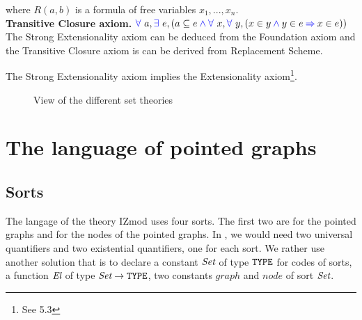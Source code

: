 \documentclass[a4paper]{article}
\begin{document}
where $R(a,b)$ is a formula of free variables $x_1, ..., x_n$. \\

\textbf{Transitive Closure axiom.} ${\color{blue} \forall}~a,{\color{blue} \exists}~e, (a \subseteq e \mathbin{\color{blue} \wedge} {\color{blue} \forall}~x,{\color{blue} \forall}~y, (x \in y \mathbin{\color{blue} \wedge} y \in e \mathbin{\color{blue} \Rightarrow} x \in e))$ \\

The Strong Extensionality axiom can be deduced from the Foundation axiom and the Transitive Closure axiom is can be derived from Replacement Scheme.

The Strong Extensionality axiom implies the Extensionality axiom\footnote{See 5.3}.

\begin{figure}[h]
\caption{View of the different set theories}
\end{figure}


\section{The language of pointed graphs}

\subsection{Sorts}

The langage of the theory IZmod uses four sorts. The first two are for
the pointed graphs and for the nodes of the pointed graphs.  In
\dedukti, we would need two universal quantifiers and two
existential quantifiers, one for each sort.  We rather use another
solution \cite{theoryU} that is to declare a constant $\mbox{\it Set}$ of type
$\mbox{\tt TYPE}$ for codes of sorts, a function ${\mbox{\it El}}$ of type $\mbox{\it Set} \rightarrow \mbox{\tt TYPE}$,
two constants $graph$ and $node$ of sort $\mbox{\it Set}$.
\end{document}
